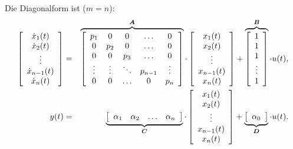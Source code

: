 \nit Die Diagonalform ist ($m=n$): 
\begin{eqnarray*}
\left [ 
\begin{array}{c}
\dot{x}_1(t)\\
\dot{x}_2(t)\\
\vdots\\
\dot{x}_{n-1}(t)\\
\dot{x}_n(t)\\
\end{array}
\right ] &=&
\overbrace{\left [ 
\begin{array}{c c c c c}
p_1 & 0 & 0 & \ldots & 0\\
0 & p_2 & 0 & \ldots & 0\\
0 & 0 & p_3 & \ldots & 0\\
\vdots & \vdots &  \ddots & p_{n-1} & \vdots\\
0 & 0 & \ldots & 0 & p_n\\
\end{array}
\right ]}^{\boldsymbol{A}} \cdot
\left [ 
\begin{array}{c}
x_1(t)\\
x_2(t)\\
\vdots \\
x_{n-1}(t)\\
x_n(t)\\
\end{array}
\right ]+
\overbrace{\left [ 
\begin{array}{c}
1\\
1\\
1\\
\vdots\\
1\\
\end{array}
\right ] }^{\boldsymbol{B}} \cdot
u(t),\\
y(t) &= &
\underbrace{\left [ 
\begin{array}{c c c c}
\alpha_1 & \alpha_2 & \ldots & \alpha_n\\
\end{array}
\right ] }_{\boldsymbol{C}}  \cdot
\left [ 
\begin{array}{c}
x_1(t)\\
x_2(t)\\
\vdots \\
x_{n-1}(t)\\
x_n(t)\\
\end{array}
\right ]+
\underbrace{\left [ 
\begin{array}{c}
\alpha_0 \\
\end{array}
\right ]}_{\boldsymbol{D}} \cdot
u(t).
\end{eqnarray*}

